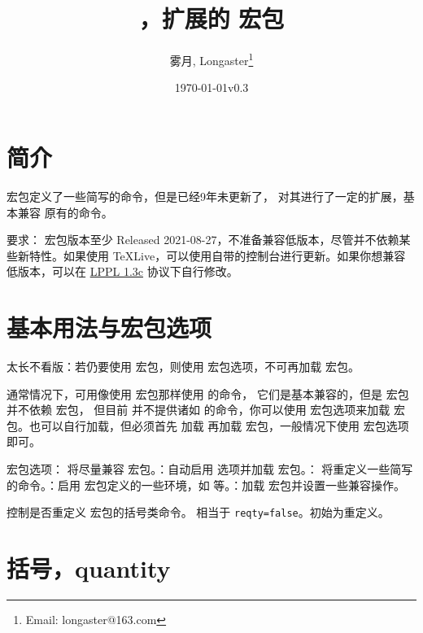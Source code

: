 \documentclass{ctxdoc}
\author{雾月, Longaster\thanks{Email: longaster@163.com}}
\title{\pkg{physicx}，扩展的 \pkg{physics} 宏包}
\date{\today\quad v0.3}
\def\emph#1{\textcolor{red!80!black}{#1}}
\begin{document}
\maketitle

\tableofcontents


\section{简介}

 宏包定义了一些简写的命令，但是已经9年未更新了， 对其进行了一定的扩展，基本兼容  原有的命令。

要求： 宏包版本至少 Released 2021-08-27，\emph{不准备兼容低版本}，尽管并不依赖某些新特性。如果使用 TeXLive，可以使用自带的控制台进行更新。如果你想兼容低版本，可以在 \href{http://www.latex-project.org/lppl.txt}{LPPL 1.3c} 协议下自行修改。

\section{基本用法与宏包选项}

\emph{太长不看版}：若仍要使用  宏包，则使用  宏包选项，\emph{不可}再加载  宏包。

通常情况下，可用像使用  宏包那样使用  的命令，
它们是基本兼容的，但是  宏包并不依赖  宏包，
但目前  并不提供诸如  的命令，你可以使用  
宏包选项来加载  宏包。也可以自行加载，但必须首先
加载  再加载  宏包，一般情况下使用  
宏包选项即可。

宏包选项： 将尽量兼容  宏包。：自动启用  选项并加载  宏包。： 将重定义一些简写的命令。：启用  宏包定义的一些环境，如  等。：加载  宏包并设置一些兼容操作。

 控制是否重定义  宏包的括号类命令。 相当于 \verb|reqty=false|。初始为重定义。

\section{括号，quantity}\label{sec:quantity}
\end{document}

